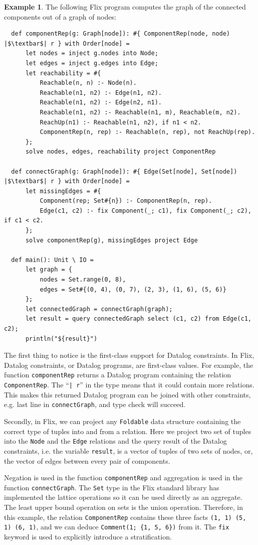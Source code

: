 \documentclass[11pt]{report}
\theoremstyle{definition}
\newtheorem{exmp}{Example}[chapter]
\begin{document}
\begin{exmp}
  The following Flix program computes the graph of the connected components out of a graph of nodes:
  \begin{verbatim}
  def componentRep(g: Graph[node]): #{ ComponentRep(node, node) |$\textbar$| r } with Order[node] =
      let nodes = inject g.nodes into Node;
      let edges = inject g.edges into Edge;
      let reachability = #{
          Reachable(n, n) :- Node(n).
          Reachable(n1, n2) :- Edge(n1, n2).
          Reachable(n1, n2) :- Edge(n2, n1).
          Reachable(n1, n2) :- Reachable(n1, m), Reachable(m, n2).
          ReachUp(n1) :- Reachable(n1, n2), if n1 < n2.
          ComponentRep(n, rep) :- Reachable(n, rep), not ReachUp(rep).
      };
      solve nodes, edges, reachability project ComponentRep

  def connectGraph(g: Graph[node]): #{ Edge(Set[node], Set[node]) |$\textbar$| r } with Order[node] =
      let missingEdges = #{
          Component(rep; Set#{n}) :- ComponentRep(n, rep).
          Edge(c1, c2) :- fix Component(_; c1), fix Component(_; c2), if c1 < c2.
      };
      solve componentRep(g), missingEdges project Edge

  def main(): Unit \ IO =
      let graph = {
          nodes = Set.range(0, 8),
          edges = Set#{(0, 4), (0, 7), (2, 3), (1, 6), (5, 6)}
      };
      let connectedGraph = connectGraph(graph);
      let result = query connectedGraph select (c1, c2) from Edge(c1, c2);
      println("${result}")
\end{verbatim}

  The first thing to notice is the first-class support for Datalog constraints. In Flix, Datalog constraints, or Datalog programs, are first-class values. For example, the function \texttt{componentRep} returns a Datalog program containing the relation \texttt{ComponentRep}. The ``\texttt{| r}'' in the type means that it could contain more relations. This makes this returned Datalog program can be joined with other constraints, e.g. last line in \texttt{connectGraph}, and type check will succeed.

  Secondly, in Flix, we can project any \texttt{Foldable} data structure containing the correct type of tuples into and from a relation. Here we project two set of tuples into the \texttt{Node} and the \texttt{Edge} relations and the query result of the Datalog constraints, i.e. the variable \texttt{result}, is a vector of tuples of two sets of nodes, or, the vector of edges between every pair of components.

  Negation is used in the function \texttt{componentRep} and aggregation is used in the function \texttt{connectGraph}. The \texttt{Set} type in the Flix standard library has implemented the lattice operations so it can be used directly as an aggregate. The least upper bound operation on sets is the union operation. Therefore, in this example, the relation \texttt{ComponentRep} contains these three facts \texttt{(1, 1) (5, 1) (6, 1)}, and we can deduce \texttt{Comment(1; \{1, 5, 6\})} from it. The \texttt{fix} keyword is used to explicitly introduce a stratification.

\end{exmp}
\label{exmp:flix-program}
\end{document}
